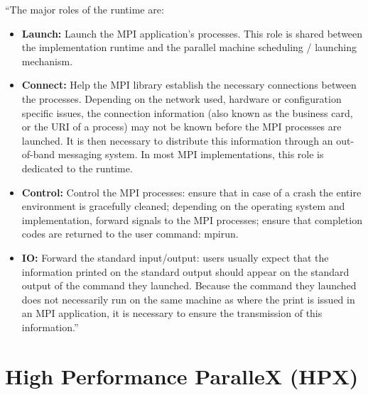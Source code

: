 ``The major roles of the runtime are:
\begin{itemize}
\item \textbf{Launch:} Launch the MPI application’s processes. This role is shared between the implementation runtime and the parallel machine scheduling / launching mechanism.
\item \textbf{Connect:} Help the MPI library establish the necessary connections between the processes. Depending on the network used, hardware or configuration specific issues, the connection information (also known as the business card, or the URI of
a process) may not be known before the MPI processes are launched. It is then necessary to distribute this information through an out-of-band messaging system. In most MPI implementations, this role is dedicated to the runtime.
\item \textbf{Control:} Control the MPI processes: ensure that in case of a crash the entire environment is gracefully cleaned; depending on the operating system and implementation, forward signals to the MPI processes; ensure that completion codes
are returned to the user command: mpirun.
\item \textbf{IO:} Forward the standard input/output: users usually expect that the information printed on the standard output should appear on the standard output of the command they launched. Because the command they launched does not necessarily run on the same machine as where the print is issued in an MPI application, it is necessary to ensure the transmission of this information.''~\cite{bosilca2011scalability}
\end{itemize}

\section{High Performance ParalleX (HPX)}





